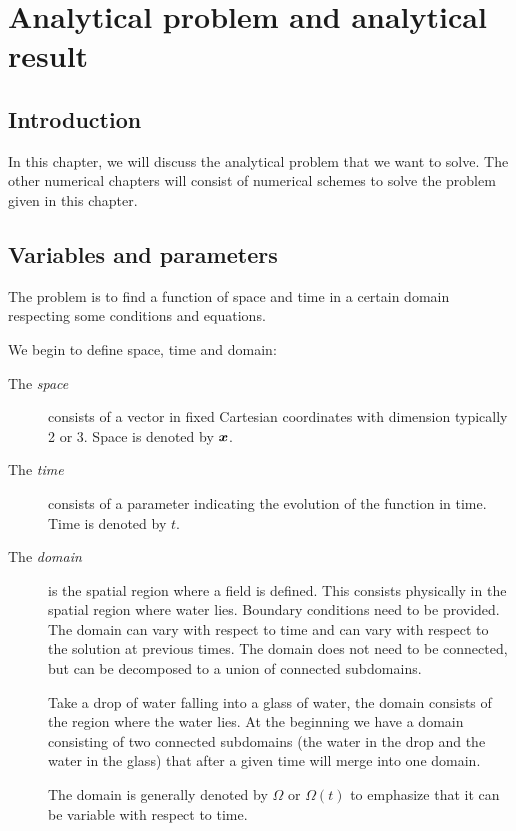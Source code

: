\chapter{Analytical problem and analytical result}

\minitoc
\section*{Introduction}
In this chapter, we will discuss the analytical problem that we want to solve.
The other numerical chapters will consist of numerical schemes to solve the problem given in this chapter.

\section{Variables and parameters}

The problem is to find a function of space and time in a certain domain respecting some conditions and equations.

We begin to define space, time and domain:
\begin{description}
\item[The \emph{space}] consists of a vector in fixed Cartesian coordinates with dimension typically 2 or 3.
Space is denoted by ${\boldsymbol {x}}$.
\item[The \emph{time}] consists of a parameter indicating the evolution of the function in time.
Time is denoted by $t$.
\item[The \emph{domain}] is the spatial region where a field is defined. This consists physically in the spatial region where water lies.
Boundary conditions need to be provided.
The domain can vary with respect to time and can vary with respect to the solution at previous times.
The domain does not need to be connected, but can be decomposed to a union of connected subdomains.

\begin{example}
 Take a drop of water falling into a glass of water, the domain consists of the region where the water lies.
 At the beginning we have a domain consisting of two connected subdomains (the water in the drop and the water in the glass)
 that after a given time will merge into one domain.
\end{example}

The domain is generally denoted by $\Omega$ or $\Omega(t)$ to emphasize that it can be variable with respect to time.
\end{description}

